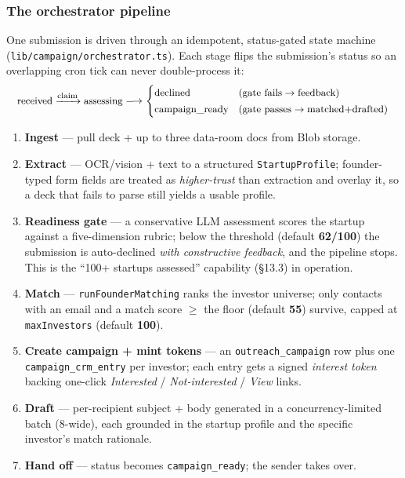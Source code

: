 \documentclass[11pt]{article}
\begin{document}
\subsubsection{The orchestrator pipeline}
One submission is driven through an idempotent, status-gated state machine
(\texttt{lib/campaign/orchestrator.ts}). Each stage flips the submission's status
so an overlapping cron tick can never double-process it:
\begin{equation*}
\small
\text{received}\xrightarrow{\text{claim}}\text{assessing}\longrightarrow
\begin{cases}
\text{declined} & \text{(gate fails}\to\text{feedback)}\\[2pt]
\text{campaign\_ready} & \text{(gate passes}\to\text{matched+drafted)}
\end{cases}
\end{equation*}
\begin{enumerate}[leftmargin=1.4em,itemsep=1pt]
\item \textbf{Ingest} --- pull deck + up to three data-room docs from Blob storage.
\item \textbf{Extract} --- OCR/vision + text to a structured \texttt{StartupProfile};
founder-typed form fields are treated as \emph{higher-trust} than extraction and
overlay it, so a deck that fails to parse still yields a usable profile.
\item \textbf{Readiness gate} --- a conservative LLM assessment scores the startup
against a five-dimension rubric; below the threshold (default \textbf{62/100}) the
submission is auto-declined \emph{with constructive feedback}, and the pipeline
stops. This is the ``100+ startups assessed'' capability (\S13.3) in operation.
\item \textbf{Match} --- \texttt{runFounderMatching} ranks the investor universe;
only contacts with an email and a match score $\ge$ the floor (default
\textbf{55}) survive, capped at \texttt{maxInvestors} (default \textbf{100}).
\item \textbf{Create campaign + mint tokens} --- an \texttt{outreach\_campaign} row
plus one \texttt{campaign\_crm\_entry} per investor; each entry gets a signed
\emph{interest token} backing one-click \emph{Interested} / \emph{Not-interested}
/ \emph{View} links.
\item \textbf{Draft} --- per-recipient subject + body generated in a
concurrency-limited batch (8-wide), each grounded in the startup profile and the
specific investor's match rationale.
\item \textbf{Hand off} --- status becomes \texttt{campaign\_ready}; the sender
takes over.
\end{enumerate}
\end{document}
